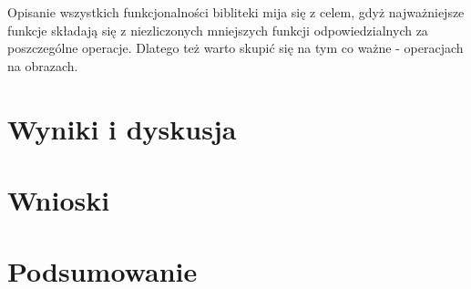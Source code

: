 \documentclass{article}
\begin{document}
        \vspace{0.5cm}

        {
            \Large
            \justifying
            \quad
            Opisanie wszystkich funkcjonalności bibliteki mija się z celem, gdyż najważniejsze funkcje składają się z niezliczonych mniejszych funkcji odpowiedzialnych za poszczególne operacje. Dlatego też warto skupić się na tym co ważne - operacjach na obrazach.
        }
    \newpage
    \section{Wyniki i dyskusja}
    \newpage
    \section{Wnioski}
    \newpage
    \section{Podsumowanie}
    \newpage
\end{document}
